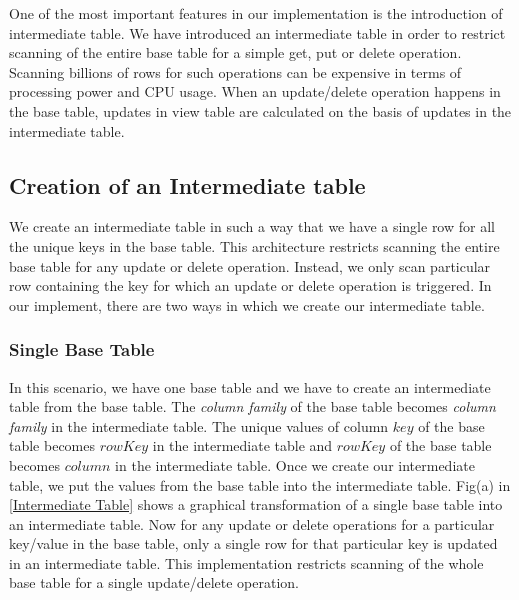 \documentclass[11pt,a4paper,bibtotoc,idxtotoc,headsepline,footsepline,footexclude,BCOR12mm,DIV13]{scrbook}
\begin{document}
One of the most important features in our implementation is the introduction of intermediate table. We have introduced an intermediate table in order to restrict scanning of the entire base table for a simple get, put or delete operation. Scanning billions of rows for such operations can be expensive in terms of processing power and CPU usage. When an update/delete operation happens in the base table, updates in view table are calculated on the basis of updates in the intermediate table.

\subsection{Creation of an Intermediate table}
\label{subsec:intermediatetable}

We create an intermediate table in such a way that we have a single row for all the unique keys in the base table. This architecture restricts scanning the entire base table for any update or delete operation. Instead, we only scan particular row containing the key for which an update or delete operation is triggered. In our implement, there are two ways in which we create our intermediate table.

\subsubsection{Single Base Table}
\label{Single Base Table}
In this scenario, we have one base table and we have to create an intermediate table from the base table. The \emph{column family} of the base table becomes \emph{column family} in the intermediate table. The unique values of column $key$ of the base table becomes $rowKey$ in the intermediate table and $rowKey$ of the base table becomes $column$ in the intermediate table. Once we create our intermediate table, we put the values from the base table into the intermediate table. Fig(a) in \ref{Intermediate Table} shows a graphical transformation of a single base table into an intermediate table. Now for any update or delete operations for a particular key/value in the base table, only a single row for that particular key is updated in an intermediate table. This implementation restricts scanning of the whole base table for a single update/delete operation.
\end{document}

